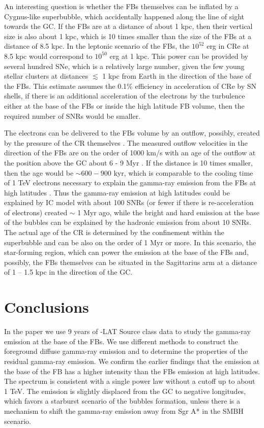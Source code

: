 An interesting question is whether the FBs themselves can be inflated by a Cygnus-like superbubble,
which accidentally happened along the line of sight towards the GC.
If the FBs are at a distance of about 1 kpc, then their vertical size is also about 1 kpc,
which is 10 times smaller than the size of the FBs at a distance of 8.5 kpc.
In the leptonic scenario of the FBs, the $10^{52}$ erg in CRe at 8.5 kpc \citep{2014ApJ...793...64A}
would correspond to $10^{50}$ erg at 1 kpc.
This power can be provided by several hundred SNe, which is a relatively large number, given the few young stellar 
clusters at distances $\lesssim$ 1 kpc from Earth in the direction of the base of the FBs.
This estimate assumes the 0.1\% efficiency in acceleration of CRe by SN shells,
if there is an additional acceleration of the electrons by the turbulence either at the base of the FBs
or inside the high latitude FB volume, then the required number of SNRs would be smaller.

The electrons can be delivered to the FBs volume by an outflow,
possibly, created by the pressure of the CR themselves \citep[e.g.,][]{2018MNRAS.475..570J}.
The measured outflow velocities in the direction of the FBs are on the order of 1000 km/s
with an age of the outflow at the position above the GC about 6 - 9 Myr \citep{2015ApJ...799L...7F, 2017ApJ...834..191B}.
If the distance is 10 times smaller, then the age would be $\sim 600 - 900$ kyr,
which is comparable to the cooling time of 1 TeV electrons necessary to explain the 
gamma-ray emission from the FBs at high latitudes \citep{2014ApJ...793...64A}.
Thus the gamma-ray emission at high latitudes could be explained by IC model with about 100 SNRs
(or fewer if there is re-acceleration of electrons)
created $\sim$ 1 Myr ago, while the bright and hard emission at the base of the bubbles can
be explained by the hadronic emission from about 10 SNRs. 
The actual age of the CR is determined by the confinement within the superbubble and can be also on the order
of 1 Myr or more.
In this scenario,
the star-forming region, which can power the emission at the base of the FBs and, possibly, the FBs themselves
can be situated in the Sagittarius arm at a distance of 1 -- 1.5 kpc in the direction of the GC.


\section{Conclusions}

In the paper we use 9 years of \Fermi-LAT Source class data to study the gamma-ray emission
at the base of the FBs.
We use different methods to construct the foreground diffuse gamma-ray emission and to determine
the properties of the residual gamma-ray emission.
We confirm the earlier findings that the emission at the base of the FB
has a higher intensity than the FBs emission at high latitudes.
The spectrum is consistent with a single power law without a cutoff up to about 1 TeV.
The emission is slightly displaced from the GC to negative longitudes,
which favors a starburst scenario of the bubbles formation, unless there is a mechanism to shift the
gamma-ray emission away from Sgr A* in the SMBH scenario.

